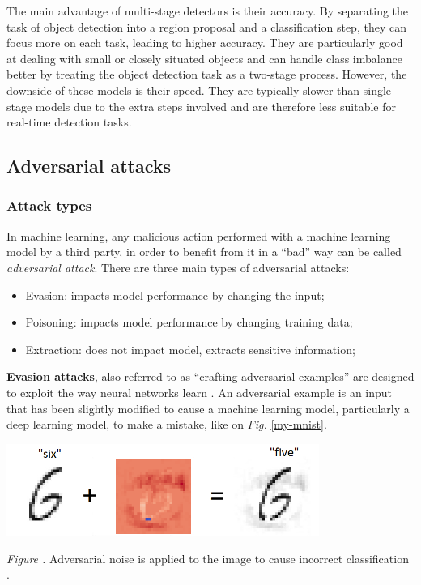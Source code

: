 \documentclass[14pt,a4paper]{extarticle}
\newcounter{e}
\newcounter{pic}
\newcommand{\pic}[1]{\refstepcounter{pic} \vspace{-0.3cm}\textit{Figure \arabic{pic}\label{#1}.}}
\newcounter{tabl}
\numberwithin{equation}{section}
\numberwithin{figure}{section}
\begin{document}
The main advantage of multi-stage detectors is their accuracy. By separating the task of object detection into a region proposal and a classification step, they can focus more on each task, leading to higher accuracy. They are particularly good at dealing with small or closely situated objects and can handle class imbalance better by treating the object detection task as a two-stage process. However, the downside of these models is their speed. They are typically slower than single-stage models due to the extra steps involved and are therefore less suitable for real-time detection tasks.

\subsection{Adversarial attacks}
\subsubsection{Attack types}
In machine learning, any malicious action performed with a machine learning model by a third party, in order to benefit from it in a ``bad'' way can be called \textit{adversarial attack}.
There are three main types of adversarial attacks:

\begin{itemize}
    \item Evasion: impacts model performance by changing the input;
    \item Poisoning: impacts model performance by changing training data;
    \item Extraction: does not impact model, extracts sensitive information;
\end{itemize}

\textbf{Evasion attacks}, also referred to as ``crafting adversarial examples'' are designed to exploit the way neural networks learn \cite{adversarial}. An adversarial example is an input that has been slightly modified to cause a machine learning model, particularly a deep learning model, to make a mistake, like on \textit{Fig.} \ref{my-mnist}.

\begin{center}
    \includegraphics[height=3cm]{images/six.png}
\end{center}
\begin{center}
    \pic{my-mnist} Adversarial noise is applied to the image to cause incorrect classification \cite{buhrii-defense}.
\end{center}
\end{document}
